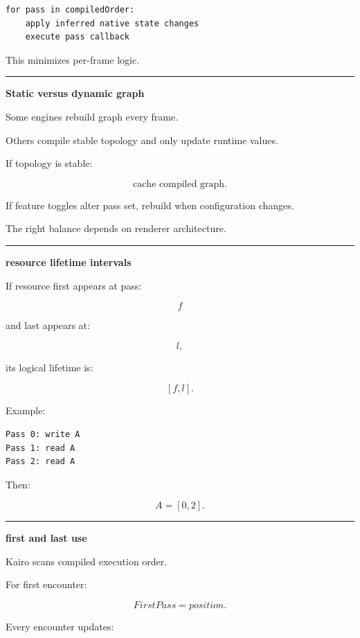 \begin{verbatim}
for pass in compiledOrder:
    apply inferred native state changes
    execute pass callback
\end{verbatim}

This minimizes per-frame logic.

\begin{center}\rule{0.5\linewidth}{0.5pt}\end{center}

\textbf{Static versus dynamic graph}

Some engines rebuild graph every frame.

Others compile stable topology and only update runtime values.

If topology is stable:

\[
\boxed{
\text{cache compiled graph}.
}
\]

If feature toggles alter pass set, rebuild when configuration changes.

The right balance depends on renderer architecture.

\begin{center}\rule{0.5\linewidth}{0.5pt}\end{center}

\textbf{resource lifetime intervals}

If resource first appears at pass:

\[
f
\]

and last appears at:

\[
l,
\]

its logical lifetime is:

\[
\boxed{
[f,l].
}
\]

Example:

\begin{verbatim}
Pass 0: write A
Pass 1: read A
Pass 2: read A
\end{verbatim}

Then:

\[
A=[0,2].
\]

\begin{center}\rule{0.5\linewidth}{0.5pt}\end{center}

\textbf{first and last use}

Kairo scans compiled execution order.

For first encounter:

\[
FirstPass=position.
\]

Every encounter updates:


